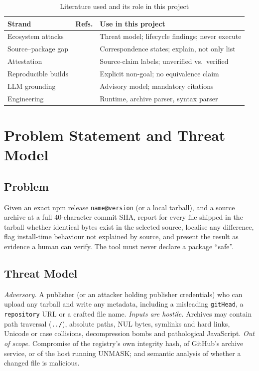 \documentclass[conference]{IEEEtran}
\newcommand{\code}[1]{\texttt{#1}}
\begin{document}
\begin{table}[t]
\caption{Literature used and its role in this project}
\label{tab:lit}
\centering
\footnotesize
\begin{tabular}{@{}p{2.2cm}p{1.2cm}p{4.1cm}@{}}
\toprule
\textbf{Strand} & \textbf{Refs.} & \textbf{Use in this project}\\
\midrule
Ecosystem attacks & \cite{eventstream,xz,zimmermann2019,ohm2020,duan2021} & Threat model; lifecycle findings; never execute\\
Source--package gap & \cite{vu2021} & Correspondence states; explain, not only list\\
Attestation & \cite{intoto,sigstore,slsa,npmprov} & Source-claim labels; unverified vs.\ verified\\
Reproducible builds & \cite{lamb2021} & Explicit non-goal; no equivalence claim\\
LLM grounding & \cite{ji2023,gao2023,gemma} & Advisory model; mandatory citations\\
Engineering & \cite{nodetest,tarstream,acorn} & Runtime, archive parser, syntax parser\\
\bottomrule
\end{tabular}
\end{table}

\section{Problem Statement and Threat Model}\label{sec:problem}

\subsection{Problem}
Given an exact npm release \code{name@version} (or a local tarball), and a
source archive at a full 40-character commit SHA, report for every file shipped
in the tarball whether identical bytes exist in the selected source, localise
any difference, flag install-time behaviour not explained by source, and present
the result as evidence a human can verify. The tool must never declare a package
``safe''.

\subsection{Threat Model}
\emph{Adversary.} A publisher (or an attacker holding publisher credentials)
who can upload any tarball and write any metadata, including a misleading
\code{gitHead}, a \code{repository} URL or a crafted file name. \emph{Inputs
are hostile.} Archives may contain path traversal (\code{../}), absolute paths,
NUL bytes, symlinks and hard links, Unicode or case collisions, decompression
bombs and pathological JavaScript. \emph{Out of scope.} Compromise of the
registry's own integrity hash, of GitHub's archive service, or of the host
running UNMASK; and semantic analysis of whether a changed file is malicious.
\end{document}
